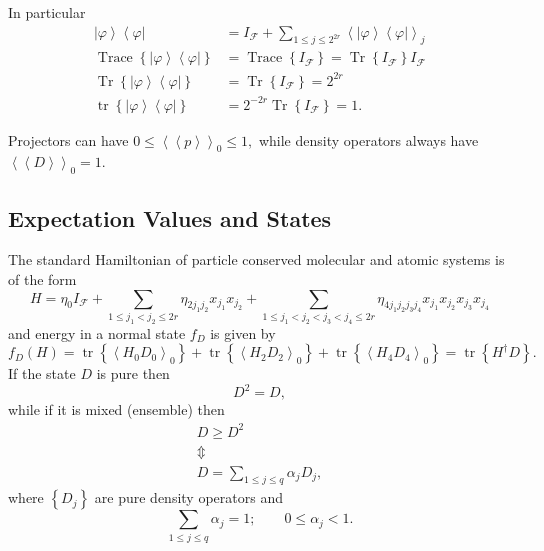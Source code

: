 \documentclass[aps,preprint]{revtex4}%
\begin{document}
In particular
\begin{align}
\left\vert \varphi\right\rangle \left\langle \varphi\right\vert  &
=I_{\mathcal{F}}+\sum_{1\leq j\leq2^{2r}}\left\langle \left\vert
\varphi\right\rangle \left\langle \varphi\right\vert \right\rangle _{j}\\
\operatorname*{Trace}\left\{  \left\vert \varphi\right\rangle \left\langle
\varphi\right\vert \right\}    & =\operatorname*{Trace}\left\{  I_{\mathcal{F}%
}\right\}  =\operatorname{Tr}\left\{  I_{\mathcal{F}}\right\}  I_{\mathcal{F}%
}\\
\operatorname{Tr}\left\{  \left\vert \varphi\right\rangle \left\langle
\varphi\right\vert \right\}    & =\operatorname{Tr}\left\{  I_{\mathcal{F}%
}\right\}  =2^{2r}\\
\operatorname*{tr}\left\{  \left\vert \varphi\right\rangle \left\langle
\varphi\right\vert \right\}    & =2^{-2r}\operatorname{Tr}\left\{
I_{\mathcal{F}}\right\}  =1.
\end{align}


Projectors can have $0\leq\left\langle \left\langle p\right\rangle
\right\rangle _{0}\leq1,$ while density operators always have $\left\langle
\left\langle D\right\rangle \right\rangle _{0}=1.$ 

\subsection{Expectation Values and States}

The standard Hamiltonian of particle conserved molecular and atomic systems is
of the form
\begin{equation}
H=\eta_{0}I_{\mathcal{F}}+\sum_{1\leq j_{1}<j_{2}\leq2r}\eta_{2j_{1}j_{2}%
}x_{j_{1}}x_{j_{2}}+\sum_{1\leq j_{1}<j_{2}<j_{3}<j_{4}\leq2r}\eta
_{4j_{1}j_{2}j_{3}j_{4}}x_{j_{1}}x_{j_{2}}x_{j_{3}}x_{j_{4}}%
\end{equation}
and energy in a normal state $f_{D}$ is given by
\begin{equation}
f_{D}\left(  H\right)  =\operatorname*{tr}\left\{  \left\langle H_{0}%
D_{0}\right\rangle _{0}\right\}  +\operatorname*{tr}\left\{  \left\langle
H_{2}D_{2}\right\rangle _{0}\right\}  +\operatorname*{tr}\left\{  \left\langle
H_{4}D_{4}\right\rangle _{0}\right\}  =\operatorname*{tr}\left\{  H^{\dagger
}D\right\}  .
\end{equation}
If the state $D$ is pure then
\begin{equation}
D^{2}=D,
\end{equation}
while if it is mixed (ensemble) then
\begin{gather}
D\geq D^{2}\\
\Updownarrow\\
D=\sum_{1\leq j\leq q}\alpha_{j}D_{j},
\end{gather}
where $\left\{  D_{j}\right\}  $ are pure density operators and
\begin{equation}
\sum_{1\leq j\leq q}\alpha_{j}=1;\qquad0\leq\alpha_{j}<1.
\end{equation}
\end{document}
